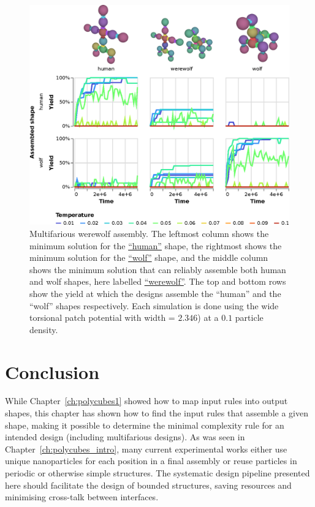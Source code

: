 \begin{figure}
    \centering
    \includegraphics[width=\linewidth]{figures/patchysim/werewolf.eps}
    \caption{Multifarious werewolf assembly. The leftmost column shows the minimum solution for the  \href{https://akodiat.github.io/polycubes/?assemblyMode=stochastic&rule=00000e040f0c88880000120000008f1600000000000b1400938700000000000000000096}{``human''} shape, the rightmost shows the minimum solution for the  \href{https://akodiat.github.io/polycubes/?assemblyMode=stochastic&rule=04000909000c0013000009098a00001400000000000009840000938c0000000000009700}{``wolf''} shape, and the middle column shows the minimum solution that can reliably assemble both human and wolf shapes, here labelled \href{https://akodiat.github.io/polycubes/?assemblyMode=stochastic&rule=11051013000018001d1d0008001700001d1da1001d1d00009e00000c0000000000000d93000000001d98000000002284000097880000000000008f00}{``werewolf''}. The top and bottom rows show the yield at which the designs assemble the ``human'' and the ``wolf'' shapes respectively. Each simulation is done using the wide torsional patch potential with width = \(2.346\)) at a \(0.1\) particle density.}
    \label{fig:multifarious_sim}
\end{figure}

\FloatBarrier
\section{Conclusion}
While Chapter~\ref{ch:polycubes1} showed how to map input rules into output shapes, this chapter has shown how to find the input rules that assemble a given shape, making it possible to determine the minimal complexity rule for an intended design (including multifarious designs). As was seen in Chapter~\ref{ch:polycubes_intro}, many current experimental works either use unique nanoparticles for each position in a final assembly or reuse particles in periodic or otherwise simple structures. The systematic design pipeline presented here should facilitate the design of bounded structures, saving resources and minimising cross-talk between interfaces.

